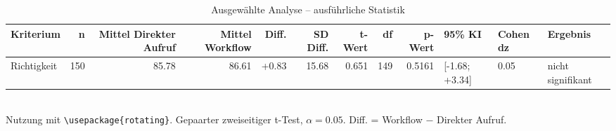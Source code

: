 \begin{table}
\centering
\caption{Ausgewählte Analyse -- ausführliche Statistik}
\begin{tabular}{lrrrrrrrrlll}
\toprule
Kriterium & n & Mittel Direkter Aufruf & Mittel Workflow & Diff. & SD Diff. & t-Wert & df & p-Wert & 95\% KI & Cohen dz & Ergebnis \\
\midrule
Richtigkeit & 150 & 85.78 & 86.61 & +0.83 & 15.68 & 0.651 & 149 & 0.5161 & [-1.68; +3.34] & 0.05 & nicht signifikant \\
\bottomrule
\end{tabular}
\\[2mm]
\footnotesize Nutzung mit \texttt{\textbackslash usepackage\{rotating\}}. Gepaarter zweiseitiger t-Test, $\alpha=0.05$. Diff. = Workflow $-$ Direkter Aufruf.
\end{table}
